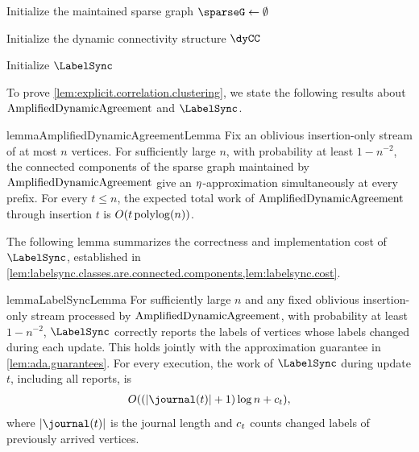 \begin{algorithm}[htbp]
    Initialize the maintained sparse graph $ \sparseG \gets \emptyset $

    Initialize the dynamic connectivity structure $ \dyCC $

    Initialize $ \LabelSync $

    \caption{$ \explicitDA $: Explicit Dynamic Agreement Algorithm for Insertion-Only Streams}
    \label{alg.explicit.dynamic.agreement}
\end{algorithm}

To prove \cref{lem:explicit.correlation.clustering}, we state the following results about $ \mathrm{AmplifiedDynamicAgreement} $ and $ \LabelSync $.

\begin{restatable}{lemma}{AmplifiedDynamicAgreementLemma}
    \label{lem:ada.guarantees}
    Fix an oblivious insertion-only stream of at most $ n $ vertices.
    For sufficiently large $ n $, with probability at least $ 1-n^{-2} $, the connected components of the sparse graph maintained by $ \mathrm{AmplifiedDynamicAgreement} $ give an $ \eta $-approximation simultaneously at every prefix.
    For every $ t\le n $, the expected total work of $ \mathrm{AmplifiedDynamicAgreement} $ through insertion $ t $ is $ O(t\operatorname{polylog}(n)) $.
\end{restatable}

The following lemma summarizes the correctness and implementation cost of $ \LabelSync $, established in \cref{lem:labelsync.classes.are.connected.components,lem:labelsync.cost}.

\begin{restatable}{lemma}{LabelSyncLemma}
    \label{lem:labelsync.guarantees}
    For sufficiently large $ n $ and any fixed oblivious insertion-only stream processed by $ \mathrm{AmplifiedDynamicAgreement} $, with probability at least $ 1-n^{-2} $, $ \LabelSync $ correctly reports the labels of vertices whose labels changed during each update.
    This holds jointly with the approximation guarantee in \cref{lem:ada.guarantees}.
    For every execution, the work of $ \LabelSync $ during update $ t $, including all reports, is
    \begin{align}
        O((\jnTime{t}+1)\log n+\nChangedVers{t}),
    \end{align}
    where $ \jnTime{t} $ is the journal length and $ c_{t} $ counts changed labels of previously arrived vertices.
\end{restatable}

